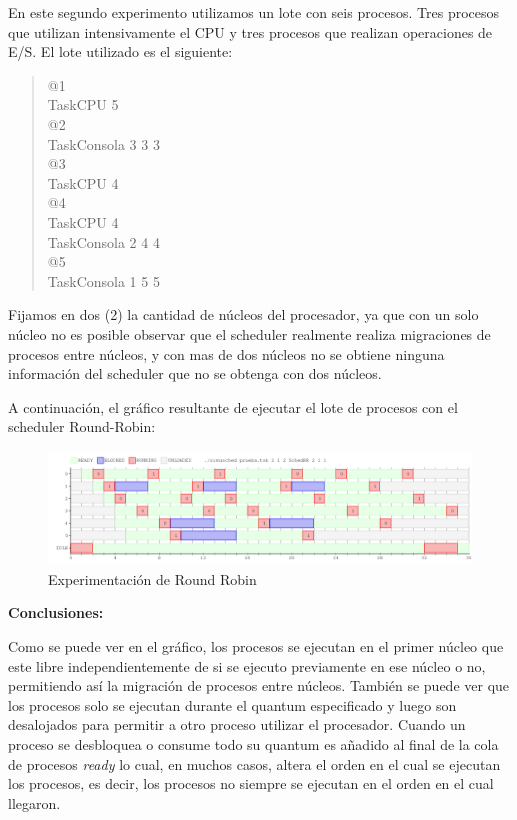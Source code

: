 En este segundo experimento utilizamos un lote con seis procesos. Tres procesos que utilizan intensivamente el CPU y tres procesos que realizan operaciones de E/S. El lote utilizado es el siguiente:

\begin{quote}
@1\\
TaskCPU 5\\
@2\\
TaskConsola 3 3 3\\
@3\\
TaskCPU 4\\
@4\\
TaskCPU 4\\
TaskConsola 2 4 4\\
@5\\
TaskConsola 1 5 5\\
\end{quote}

Fijamos en dos (2) la cantidad de núcleos del procesador, ya que con un solo núcleo no es posible observar que el scheduler realmente realiza migraciones de procesos entre núcleos, y con mas de dos núcleos no se obtiene ninguna información del scheduler que no se obtenga con dos núcleos.

A continuación, el gráfico resultante de ejecutar el lote de procesos con el scheduler Round-Robin:

\begin{figure}[H]
\begin{center}
\includegraphics[width=1.1\textwidth]{img/salida_ej4_2.png}
     \caption{Experimentación de Round Robin}
\end{center}
\end{figure}

\textbf{Conclusiones:} 

Como se puede ver en el gráfico, los procesos se ejecutan en el primer núcleo que este libre independientemente de si se ejecuto previamente en ese núcleo o no, permitiendo así la migración de procesos entre núcleos.
También se puede ver que los procesos solo se ejecutan durante el quantum especificado y luego son desalojados para permitir a otro proceso utilizar el procesador.
Cuando un proceso se desbloquea o consume todo su quantum es añadido al final de la cola de procesos \textit{ready} lo cual, en muchos casos, altera el orden en el cual se ejecutan los procesos, es decir, los procesos no siempre se ejecutan en el orden en el cual llegaron.











